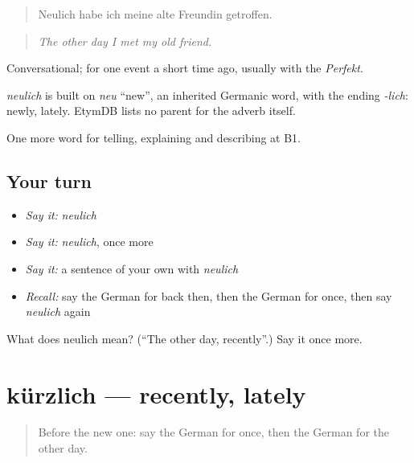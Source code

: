 \begin{quote}
Neulich habe ich meine alte Freundin getroffen.
\end{quote}

\begin{quote}
\emph{The other day I met my old friend.}
\end{quote}

Conversational; for one event a short time ago, usually with the \emph{Perfekt}.

\begin{cousinweb}
\emph{neulich} is built on \emph{neu} \textquotedblleft{}new\textquotedblright{}, an inherited Germanic word, with the ending \emph{-lich}: newly, lately. EtymDB lists no parent for the adverb itself.
\end{cousinweb}

\begin{grammarlens}[title={What you've built}]
One more word for telling, explaining and describing at B1.
\end{grammarlens}

\subsection*{Your turn}
\begin{itemize}
\raggedright
  \item \emph{Say it:} \emph{neulich}
  \item \emph{Say it:} \emph{neulich}, once more
  \item \emph{Say it:} a sentence of your own with \emph{neulich}
  \item \emph{Recall:} say the German for back then, then the German for once, then say \emph{neulich} again
\end{itemize}

\begin{tcolorbox}[breakable,colback=teal!4,colframe=teal!35!black,title={Before you move on}]
What does neulich mean? (\textquotedblleft{}The other day, recently\textquotedblright{}.) Say it once more.
\end{tcolorbox}
\section[kürzlich]{kürzlich — recently, lately}

\label{lesson:GE-C264-kuerzlich}



\begin{quote}
Before the new one: say the German for once, then the German for the other day.
\end{quote}

